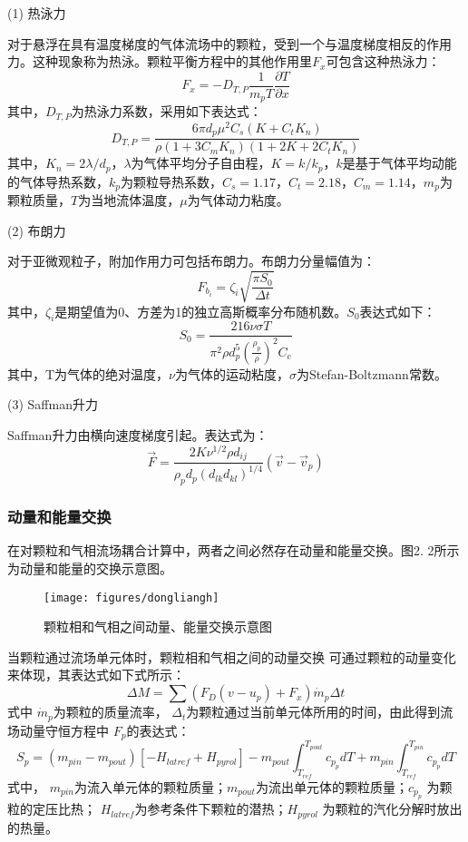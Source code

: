 (1) 热泳力

对于悬浮在具有温度梯度的气体流场中的颗粒，受到一个与温度梯度相反的作用力。这种现象称为热泳。颗粒平衡方程中的其他作用里$F_x$可包含这种热泳力：
\begin{equation}
{F_x} =  - {D_{T,P}}\frac{1}{{{m_p}T}}\frac{{\partial T}}{{\partial x}}
\end{equation}
其中，${D_{T,P}}$为热泳力系数，采用如下表达式：
\begin{equation}
{D_{T,P}} = \frac{{6\pi {d_p}{\mu ^2}{C_s}(K + {C_t}{K_n})}}{{\rho (1 + 3{C_m}{K_n})(1 + 2K + 2{C_t}{K_n})}}
\end{equation}
其中，$K_n=2\lambda/d_p$，$\lambda$为气体平均分子自由程，$K=k/k_p$，$k$是基于气体平均动能的气体导热系数，$k_p$为颗粒导热系数，$C_s=1.17$，$C_t=2.18$，$C_m=1.14$，$m_p$为颗粒质量，$T$为当地流体温度，$\mu$为气体动力粘度。

(2) 布朗力

对于亚微观粒子，附加作用力可包括布朗力。布朗力分量幅值为：
\begin{equation}
{F_{{b_i}}} = {\zeta _i}\sqrt {\frac{{\pi {S_0}}}{{\Delta t}}} 
\end{equation}
其中，${\zeta _i}$是期望值为0、方差为1的独立高斯概率分布随机数。$S_0$表达式如下：
\begin{equation}
{S_0} = \frac{{216\nu \sigma T}}{{{\pi ^2}\rho d_p^5{{\left( {\frac{{{\rho _p}}}{\rho }} \right)}^2}{C_c}}}
\end{equation}
其中，T为气体的绝对温度，$ν$为气体的运动粘度，$\sigma$为Stefan-Boltzmann常数。

(3) Saffman升力

Saffman升力由横向速度梯度引起。表达式为：
\begin{equation}
\vec F = \frac{{2K{\nu ^{1/2}}\rho {d_{ij}}}}{{{\rho _p}{d_p}{{({d_{lk}}{d_{kl}})}^{1/4}}}}(\vec v - {\vec v_p})
\end{equation}
\subsubsection{动量和能量交换}
在对颗粒和气相流场耦合计算中，两者之间必然存在动量和能量交换。图2. 2所示为动量和能量的交换示意图。
\begin{figure}[htbp]
	\centering
	\texttt{[image: figures/dongliangh]}
	\caption{颗粒相和气相之间动量、能量交换示意图}
	\label{fig:dongliangh}
\end{figure}
当颗粒通过流场单元体时，颗粒相和气相之间的动量交换 可通过颗粒的动量变化来体现，其表达式如下式所示：
\begin{equation}
\Delta M = \sum {({F_D}(v - {u_p}) + {F_x})} {\dot m_p}\Delta t
\end{equation}
式中 $\dot m_p$为颗粒的质量流率， $\Delta_t$为颗粒通过当前单元体所用的时间，由此得到流场动量守恒方程中 $F_p$的表达式：
\begin{equation}
{S_p} = ({m_{pin}} - {m_{pout}})[ - {H_{latref}} + {H_{pyrol}}] - {m_{pout}}\int_{{T_{ref}}}^{{T_{pout}}} {{c_{{p_p}}}dT}  + {m_{pin}}\int_{{T_{ref}}}^{{T_{pin}}} {{c_{{p_p}}}dT}\label{eq:liuchangdongliang}
\end{equation}
式中， $m_{pin}$为流入单元体的颗粒质量；$m_{pout}$为流出单元体的颗粒质量；$c_{p_p}$ 为颗粒的定压比热； $H_{latref}$为参考条件下颗粒的潜热；$H_{pyrol}$ 为颗粒的汽化分解时放出的热量。
